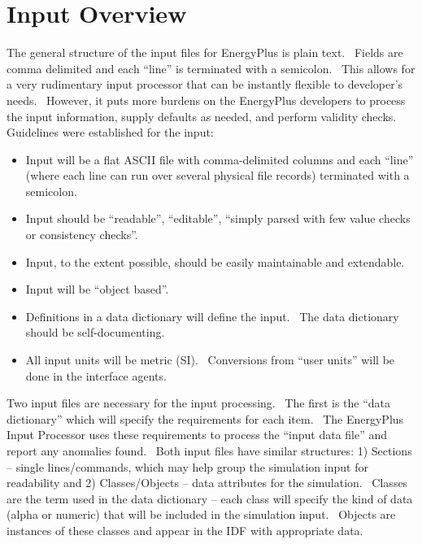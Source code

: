 \chapter{Input Overview}\label{input-overview}

The general structure of the input files for EnergyPlus is plain text.~ Fields are comma delimited and each ``line'' is terminated with a semicolon.~ This allows for a very rudimentary input processor that can be instantly flexible to developer's needs.~ However, it puts more burdens on the EnergyPlus developers to process the input information, supply defaults as needed, and perform validity checks.~ Guidelines were established for the input:

\begin{itemize}
\item
  Input will be a flat ASCII file with comma-delimited columns and each ``line'' (where each line can run over several physical file records) terminated with a semicolon.
\item
  Input should be ``readable'', ``editable'', ``simply parsed with few value checks or consistency checks''.
\item
  Input, to the extent possible, should be easily maintainable and extendable.
\item
  Input will be ``object based''.
\item
  Definitions in a data dictionary will define the input.~ The data dictionary should be self-documenting.
\item
  All input units will be metric (SI).~ Conversions from ``user units'' will be done in the interface agents.
\end{itemize}

Two input files are necessary for the input processing.~ The first is the ``data dictionary'' which will specify the requirements for each item.~ The EnergyPlus Input Processor uses these requirements to process the ``input data file'' and report any anomalies found.~ Both input files have similar structures: 1) Sections -- single lines/commands, which may help group the simulation input for readability and 2) Classes/Objects -- data attributes for the simulation.~ Classes are the term used in the data dictionary -- each class will specify the kind of data (alpha or numeric) that will be included in the simulation input.~ Objects are instances of these classes and appear in the IDF with appropriate data.
